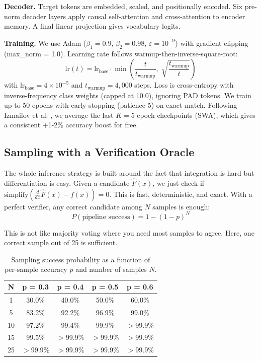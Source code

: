 \documentclass[conference]{IEEEtran}
\begin{document}
\textbf{Decoder.} Target tokens are embedded, scaled, and positionally encoded. Six pre-norm decoder layers apply causal self-attention and cross-attention to encoder memory. A final linear projection gives vocabulary logits.

\textbf{Training.} We use Adam ($\beta_1 = 0.9$, $\beta_2 = 0.98$, $\varepsilon = 10^{-9}$) with gradient clipping (max\_norm = 1.0). Learning rate follows warmup-then-inverse-square-root:
\begin{equation}
\text{lr}(t) = \text{lr}_\text{base} \cdot \min\!\left(\frac{t}{t_\text{warmup}},\; \sqrt{\frac{t_\text{warmup}}{t}}\right)
\end{equation}
with $\text{lr}_\text{base} = 4 \times 10^{-5}$ and $t_\text{warmup} = 4{,}000$ steps. Loss is cross-entropy with inverse-frequency class weights (capped at 10.0), ignoring PAD tokens. We train up to 50 epochs with early stopping (patience 5) on exact match. Following Izmailov et al. \cite{b17}, we average the last $K = 5$ epoch checkpoints (SWA), which gives a consistent +1-2\% accuracy boost for free.

\subsection{Sampling with a Verification Oracle}

The whole inference strategy is built around the fact that integration is hard but differentiation is easy. Given a candidate $\hat{F}(x)$, we just check if $\text{simplify}(\frac{d}{dx}\hat{F}(x) - f(x)) = 0$. This is fast, deterministic, and exact. With a perfect verifier, any correct candidate among $N$ samples is enough:
\begin{equation}
P(\text{pipeline success}) = 1 - (1 - p)^N
\label{eq:sampling}
\end{equation}

This is not like majority voting where you need most samples to agree. Here, one correct sample out of 25 is sufficient.

\begin{table}[htbp]
\caption{Sampling success probability as a function of per-sample accuracy $p$ and number of samples $N$.}
\begin{center}
\begin{tabular}{|c|c|c|c|c|}
\hline
\textbf{N} & \textbf{p = 0.3} & \textbf{p = 0.4} & \textbf{p = 0.5} & \textbf{p = 0.6} \\
\hline
1 & 30.0\% & 40.0\% & 50.0\% & 60.0\% \\
\hline
5 & 83.2\% & 92.2\% & 96.9\% & 99.0\% \\
\hline
10 & 97.2\% & 99.4\% & 99.9\% & $>$99.9\% \\
\hline
15 & 99.5\% & $>$99.9\% & $>$99.9\% & $>$99.9\% \\
\hline
25 & $>$99.9\% & $>$99.9\% & $>$99.9\% & $>$99.9\% \\
\hline
\end{tabular}
\label{tab:sampling_theory}
\end{center}
\end{table}
\end{document}
